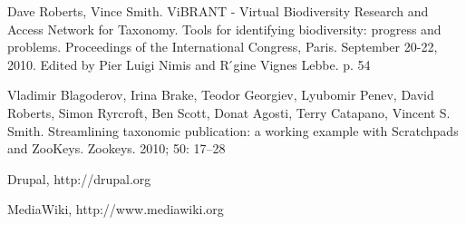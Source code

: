 \documentclass{llncs}
\begin{document}
\begin{thebibliography}{5}
 Dave Roberts, Vince Smith. ViBRANT - Virtual
  Biodiversity Research and Access Network for Taxonomy. Tools for
  identifying biodiversity: progress and problems. Proceedings of the
  International Congress, Paris. September 20-22, 2010. Edited by Pier
  Luigi Nimis and R ́gine Vignes Lebbe. p. 54

 Vladimir Blagoderov, Irina Brake, Teodor
  Georgiev, Lyubomir Penev, David Roberts, Simon Ryrcroft, Ben Scott,
  Donat Agosti, Terry Catapano, Vincent S. Smith. Streamlining
  taxonomic publication: a working example with Scratchpads and
  ZooKeys. Zookeys. 2010; 50: 17–28

 Drupal, http://drupal.org

 MediaWiki, http://www.mediawiki.org


\end{thebibliography}
\end{document}
